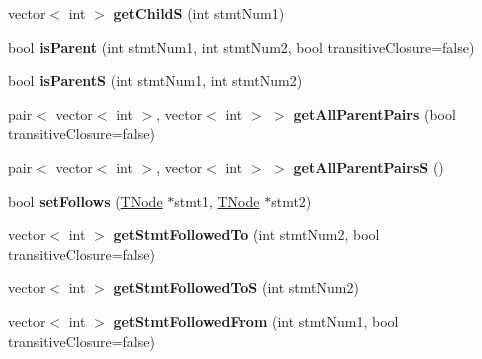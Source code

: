 \begin{DoxyCompactItemize}
\item 
\hypertarget{class_p_k_b_a37f1e902a818d98f6d69b183977ac91d}{}vector$<$ int $>$ {\bfseries get\+Child\+S} (int stmt\+Num1)\label{class_p_k_b_a37f1e902a818d98f6d69b183977ac91d}

\item 
\hypertarget{class_p_k_b_ad3599251f1d8110a4ca107197c944829}{}bool {\bfseries is\+Parent} (int stmt\+Num1, int stmt\+Num2, bool transitive\+Closure=false)\label{class_p_k_b_ad3599251f1d8110a4ca107197c944829}

\item 
\hypertarget{class_p_k_b_a7df8d85b8745c159332e594f85ee44a7}{}bool {\bfseries is\+Parent\+S} (int stmt\+Num1, int stmt\+Num2)\label{class_p_k_b_a7df8d85b8745c159332e594f85ee44a7}

\item 
\hypertarget{class_p_k_b_aaffa0700682bdcf059fab3f2ba05668e}{}pair$<$ vector$<$ int $>$, vector$<$ int $>$ $>$ {\bfseries get\+All\+Parent\+Pairs} (bool transitive\+Closure=false)\label{class_p_k_b_aaffa0700682bdcf059fab3f2ba05668e}

\item 
\hypertarget{class_p_k_b_a0246cf74d3a109563e461e2813407eda}{}pair$<$ vector$<$ int $>$, vector$<$ int $>$ $>$ {\bfseries get\+All\+Parent\+Pairs\+S} ()\label{class_p_k_b_a0246cf74d3a109563e461e2813407eda}

\item 
\hypertarget{class_p_k_b_a083ab5baff586b190352d31112cd2dda}{}bool {\bfseries set\+Follows} (\hyperlink{class_t_node}{T\+Node} $\ast$stmt1, \hyperlink{class_t_node}{T\+Node} $\ast$stmt2)\label{class_p_k_b_a083ab5baff586b190352d31112cd2dda}

\item 
\hypertarget{class_p_k_b_a4a627a83a6ca91a599fac3efe928a49d}{}vector$<$ int $>$ {\bfseries get\+Stmt\+Followed\+To} (int stmt\+Num2, bool transitive\+Closure=false)\label{class_p_k_b_a4a627a83a6ca91a599fac3efe928a49d}

\item 
\hypertarget{class_p_k_b_a6140e8a103913b65086ad203804054a9}{}vector$<$ int $>$ {\bfseries get\+Stmt\+Followed\+To\+S} (int stmt\+Num2)\label{class_p_k_b_a6140e8a103913b65086ad203804054a9}

\item 
\hypertarget{class_p_k_b_a96e3ea5fdcb5f7beefa1c8ba69e7bf44}{}vector$<$ int $>$ {\bfseries get\+Stmt\+Followed\+From} (int stmt\+Num1, bool transitive\+Closure=false)\label{class_p_k_b_a96e3ea5fdcb5f7beefa1c8ba69e7bf44}


\end{DoxyCompactItemize}
